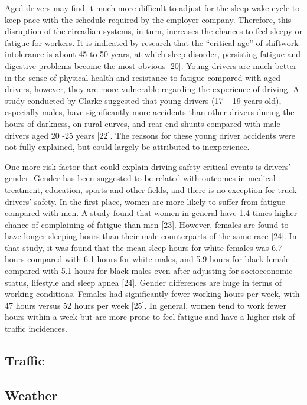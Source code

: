 \documentclass[12pt]{book}
\numberwithin{equation}{chapter}
\begin{document}
Aged drivers may find it much more difficult to adjust for the sleep-wake cycle to keep pace with the schedule required by the employer company. Therefore, this disruption of the circadian systems, in turn, increases the chances to feel sleepy or fatigue for workers. It is indicated by research that the ``critical age'' of shiftwork intolerance is about 45 to 50 years, at which sleep disorder, persisting fatigue and digestive problems become the most obvious {[}20{]}. Young drivers are much better in the sense of physical health and resistance to fatigue compared with aged drivers, however, they are more vulnerable regarding the experience of driving. A study conducted by Clarke suggested that young drivers (17 -- 19 years old), especially males, have significantly more accidents than other drivers during the hours of darkness, on rural curves, and rear-end shunts compared with male drivers aged 20 -25 years {[}22{]}. The reasons for these young driver accidents were not fully explained, but could largely be attributed to inexperience.

One more risk factor that could explain driving safety critical events is drivers' gender. Gender has been suggested to be related with outcomes in medical treatment, education, sports and other fields, and there is no exception for truck drivers' safety. In the first place, women are more likely to suffer from fatigue compared with men. A study found that women in general have 1.4 times higher chance of complaining of fatigue than men {[}23{]}. However, females are found to have longer sleeping hours than their male counterparts of the same race {[}24{]}. In that study, it was found that the mean sleep hours for white females was 6.7 hours compared with 6.1 hours for white males, and 5.9 hours for black female compared with 5.1 hours for black males even after adjusting for socioeconomic status, lifestyle and sleep apnea {[}24{]}. Gender differences are huge in terms of working conditions. Females had significantly fewer working hours per week, with 47 hours versus 52 hours per week {[}25{]}. In general, women tend to work fewer hours within a week but are more prone to feel fatigue and have a higher risk of traffic incidences.

\hypertarget{traffic}{%
\subsection{Traffic}\label{traffic}}

\hypertarget{weather}{%
\subsection{Weather}\label{weather}}
\end{document}
